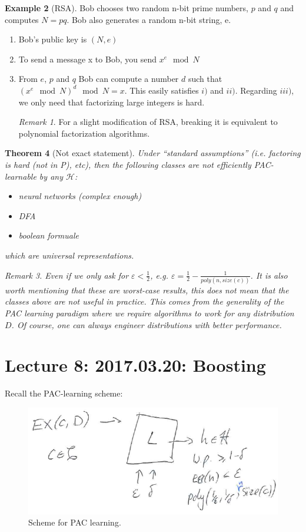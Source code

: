 \documentclass[12pt, letterpaper]{article}
\numberwithin{equation}{section} %
\newcommand{\mc}{\mathcal}
\newcommand{\ve}{\varepsilon}
\newtheorem{theorem}{Theorem}[section]
\theoremstyle{definition}
\newtheorem{example}[theorem]{Example}
\theoremstyle{remark}
\newtheorem{remark}[theorem]{Remark}
\begin{document}
\begin{example}[RSA]
Bob chooses two random n-bit prime numbers, $p$ and $q$ and computes $N=pq$. Bob also generates a random n-bit string, e.
\begin{enumerate}
\item Bob's public key is $(N, e)$
\item To send a message x to Bob, you send $x^e\mod N$
\item From $e$, $p$ and $q$ Bob can compute a number $d$ such that $(x^e \mod N)^d \mod N = x$.
This easily satisfies $i)$ and $ii)$. Regarding $iii)$, we only need that factorizing large integers is hard.
\begin{remark}
For a slight modification of RSA, breaking it is equivalent to polynomial factorization algorithms.
\end{remark}
\end{enumerate}
\end{example}

\begin{theorem}[Not exact statement]
Under ``standard assumptions'' (i.e. factoring is hard (not in P), etc), then the following classes are not efficiently PAC-learnable by \emph{any} $\mc H$:
\begin{itemize}
\item neural networks (complex enough)
\item DFA
\item boolean formuale
\end{itemize}
which are universal representations.
\begin{remark}
Even if we only  ask for $\ve < \frac12$, e.g. $\ve = \frac12 - \frac1{poly(n, size(c))}$. It is also worth mentioning that these are worst-case results, this does not mean that the classes above are not useful in practice. This comes from the generality of the PAC learning paradigm where we require algorithms to work for any distribution $D$. Of course, one can always engineer distributions with better performance.
\end{remark}
\end{theorem}

\section{Lecture 8: 2017.03.20: Boosting}
Recall the PAC-learning scheme:
\begin{figure}[H]
\centering
\includegraphics[width=0.6\linewidth]{img/pac-learning.png}
\caption{Scheme for PAC learning.}
\end{figure}
\end{document}
